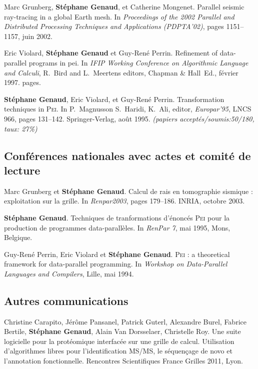 \begin{thebibliography}{99}
Marc Grunberg, \textbf{Stéphane Genaud}, et Catherine Mongenet.
\newblock Parallel seismic ray-tracing in a global {E}arth mesh.
\newblock In {\em Proceedings of the 2002 Parallel and Distributed Processing
  Techniques and Applications (PDPTA'02)}, pages 1151--1157, juin 2002.

Eric Violard, \textbf{Stéphane Genaud} et Guy-René Perrin.
\newblock Refinement of data-parallel programs in pei.
\newblock In {\em IFIP Working Conference on Algorithmic Language and Calculi}, 
R.~Bird and L.~Meertens editors, Chapman \& Hall~Ed., février 1997.
 pages.

\textbf{Stéphane Genaud}, Eric Violard, et Guy-René Perrin.
\newblock Transformation techniques in \textsc{Pei}.
\newblock In P.~Magnusson S.~Haridi, K.~Ali, editor, {\em Europar'95}, LNCS
  966, pages 131--142. Springer-Verlag, août 1995.
\newblock \small{\textit{(papiers acceptés/soumis:50/180, taux: 27\%)}}




\subsection*{Conférences nationales avec actes et comité de lecture}
Marc Grunberg et \textbf{Stéphane Genaud}.
\newblock Calcul de rais en tomographie sismique : exploitation sur la grille.
\newblock In {\em Renpar2003}, pages 179--186. INRIA, octobre 2003.

\textbf{Stéphane Genaud}.
\newblock Techniques de tranformations d'énoncés \textsc{Pei} pour la
  production de programmes data-parallèles.
\newblock In {\em RenPar 7}, mai 1995, Mons, Belgique.

Guy-René Perrin, Eric Violard et \textbf{Stéphane Genaud}.
\newblock \textsc{Pei} : a theoretical framework for data-parallel programming.
\newblock In {\em Workshop on Data-Parallel Languages and Compilers}, Lille, 
mai 1994.
\vspace{3mm}


\subsection*{Autres communications}

Christine Carapito, Jérôme Pansanel, Patrick Guterl, Alexandre Burel, Fabrice 
Bertile, \textbf{Stéphane Genaud}, Alain Van Dorsselaer, Christelle Roy.
\newblock Une suite logicielle pour la protéomique interfacée sur une grille de 
calcul. Utilisation d'algorithmes libres pour l'identification MS/MS, le 
séquençage de novo et l'annotation fonctionnelle.
\newblock Rencontres Scientifiques France Grilles 2011, Lyon.



\end{thebibliography}

